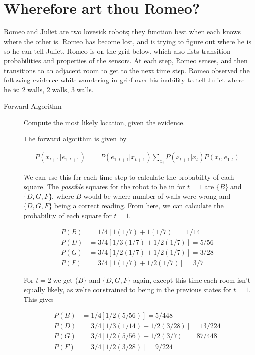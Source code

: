 \documentclass[12pt]{article}
\begin{document}
\section{Wherefore art thou Romeo?}

Romeo and Juliet are two lovesick robots; they function best when each
knows where the other is.  Romeo has become lost, and is trying to
figure out where he is so he can tell Juliet.  Romeo is on the grid
below, which also lists transition probabilities and properties of the
sensors.  At each step, Romeo senses, and then transitions to an
adjacent room to get to the next time step.  Romeo observed the
following evidence while wandering in grief over his inability to tell
Juliet where he is: 2 walls, 2 walls, 3 walls.

\begin{description}

\item[Forward Algorithm] Compute the most likely location, given the evidence.

The forward algorithm is given by

\begin{align*}
  P(x_{t+1}|e_{1:t+1}) &= P(e_{1:t+1}|x_{t+1})\sum_{x_{t}}P(x_{t+1}|x_{t})P(x_{t},e_{1:t})
\end{align*}

We can use this for each time step to calculate the probability of each square. The {\em possible} squares for the robot to be in for $t = 1$ are $\{B\}$ and $\{D,G,F\}$, where $B$ would be where number of walls were wrong and $\{D,G,F\}$ being a correct reading. From here, we can calculate the probability of each square for $t = 1$.

\begin{align*}
  P(B) &= 1/4[1(1/7) + 1(1/7)] = 1/14\\
  P(D) &= 3/4[1/3(1/7) + 1/2(1/7)] = 5/56\\
  P(G) &= 3/4[1/2(1/7) + 1/2(1/7)] = 3/28\\
  P(F) &= 3/4[1(1/7) + 1/2(1/7)] = 3/7
\end{align*}

For $t = 2$ we get $\{B\}$ and $\{D,G,F\}$ again, except this time each room isn't equally likely, as we're constrained to being in the previous states for $t = 1$. This gives

\begin{align*}
  P(B) &= 1/4[1/2(5/56)] = 5/448\\
  P(D) &= 3/4[1/3(1/14) + 1/2(3/28)] = 13/224\\
  P(G) &= 3/4[1/2(5/56) + 1/2(3/7)] = 87/448\\
  P(F) &= 3/4[1/2(3/28)] = 9/224
\end{align*}


\end{description}
\end{document}
